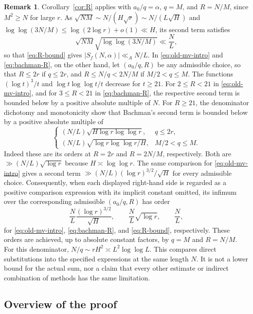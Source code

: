 \documentclass[11pt]{amsart}
\numberwithin{equation}{section}
\numberwithin{figure}{section}
\theoremstyle{definition}
\newtheorem{remark}{Remark}[section]
\begin{document}
\begin{remark}
Corollary~\ref{cor:R} applies with $a_0/q=\alpha$, $q=M$, and
$R=N/M$, since $M^2\ge N$ for large $r$. As
$\sqrt{NM}\sim N/(H\sqrt r)\sim N/(L\sqrt H)$ and
$\log\log(3N/M)\le\log(2\log r)+o(1)\ll H$, its second term satisfies
\[
 \sqrt{NM}\sqrt{\log\log(3N/M)}\ll\frac NL,
\]
so that \eqref{eq:R-bound} gives $|S_f(N,\alpha)|\ll_AN/L$. In
\eqref{eq:old-mv-intro} and \eqref{eq:bachman-R}, on the other hand,
let $(a_0/q,R)$ be any admissible choice, so that $R\le2r$ if
$q\le2r$, and $R\le N/q<2N/M$ if $M/2<q\le M$. The functions $(\log t)^3/t$ and $\log t\log\log t/t$ decrease for
$t\ge21$. For $2\le R<21$ in \eqref{eq:old-mv-intro}, and for
$3\le R<21$ in \eqref{eq:bachman-R}, the respective second term is
bounded below by a positive absolute multiple of $N$.
For $R\ge21$, the denominator dichotomy and monotonicity show that
Bachman's second term is bounded below by a positive absolute
multiple of
\[
 \begin{cases}
 (N/L)\sqrt{H\log r\log\log r},&q\le2r,\\
 (N/L)\sqrt{\log r\log\log r/H},&M/2<q\le M.
 \end{cases}
\]
Indeed these are its orders at $R=2r$ and $R=2N/M$, respectively.
Both are $\gg(N/L)\sqrt{\log r}$ because $H\asymp\log\log r$.
The same comparison for \eqref{eq:old-mv-intro} gives a second term
$\gg(N/L)(\log r)^{3/2}/\sqrt H$ for every admissible choice.
Consequently, when each displayed right-hand side is regarded as a
positive comparison expression with its implicit constant omitted,
its infimum over the corresponding admissible $(a_0/q,R)$ has order
\[
 \frac NL\frac{(\log r)^{3/2}}{\sqrt H},\qquad
 \frac NL\sqrt{\log r},\qquad \frac NL,
\]
for \eqref{eq:old-mv-intro}, \eqref{eq:bachman-R}, and
\eqref{eq:R-bound}, respectively. These orders are achieved, up to
absolute constant factors, by $q=M$ and $R=N/M$.
For this denominator, $N/q\sim rH^2\asymp L^2\log\log L$.
This compares direct substitutions into the specified expressions at
the same length $N$. It is not a lower bound for the actual sum, nor
a claim that every other estimate or indirect combination of methods
has the same limitation.
\end{remark}

\subsection{Overview of the proof}
\end{document}
